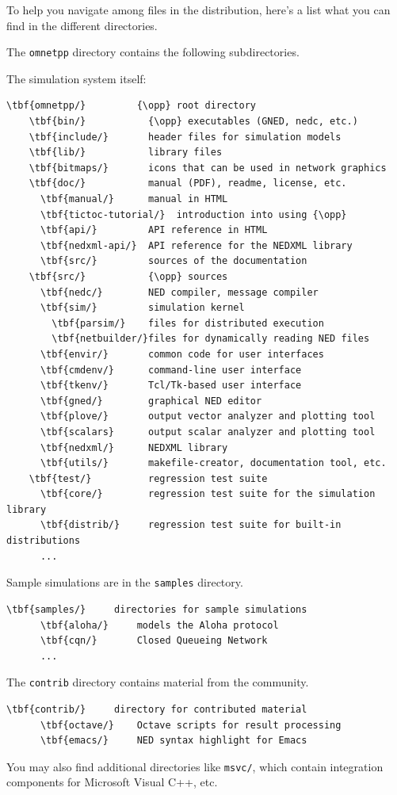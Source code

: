 To help you navigate among files in the {\opp} distribution,
here's a list what you can find in the different directories.

The \texttt{omnetpp} directory contains the following subdirectories.

The simulation system itself:

\begin{Verbatim}[commandchars=\\\{\}]
  \tbf{omnetpp/}         {\opp} root directory
    \tbf{bin/}           {\opp} executables (GNED, nedc, etc.)
    \tbf{include/}       header files for simulation models
    \tbf{lib/}           library files
    \tbf{bitmaps/}       icons that can be used in network graphics
    \tbf{doc/}           manual (PDF), readme, license, etc.
      \tbf{manual/}      manual in HTML
      \tbf{tictoc-tutorial/}  introduction into using {\opp}
      \tbf{api/}         API reference in HTML
      \tbf{nedxml-api/}  API reference for the NEDXML library
      \tbf{src/}         sources of the documentation
    \tbf{src/}           {\opp} sources
      \tbf{nedc/}        NED compiler, message compiler
      \tbf{sim/}         simulation kernel
        \tbf{parsim/}    files for distributed execution
        \tbf{netbuilder/}files for dynamically reading NED files
      \tbf{envir/}       common code for user interfaces
      \tbf{cmdenv/}      command-line user interface
      \tbf{tkenv/}       Tcl/Tk-based user interface
      \tbf{gned/}        graphical NED editor
      \tbf{plove/}       output vector analyzer and plotting tool
      \tbf{scalars}      output scalar analyzer and plotting tool
      \tbf{nedxml/}      NEDXML library
      \tbf{utils/}       makefile-creator, documentation tool, etc.
    \tbf{test/}          regression test suite
      \tbf{core/}        regression test suite for the simulation library
      \tbf{distrib/}     regression test suite for built-in distributions
      ...
\end{Verbatim}

Sample simulations are in the \texttt{samples} directory.

\begin{Verbatim}[commandchars=\\\{\}]
    \tbf{samples/}     directories for sample simulations
      \tbf{aloha/}     models the Aloha protocol
      \tbf{cqn/}       Closed Queueing Network
      ...
\end{Verbatim}

The \texttt{contrib} directory contains material from the {\opp} community.

\begin{Verbatim}[commandchars=\\\{\}]
    \tbf{contrib/}     directory for contributed material
      \tbf{octave/}    Octave scripts for result processing
      \tbf{emacs/}     NED syntax highlight for Emacs
\end{Verbatim}

You may also find additional directories like \texttt{msvc/}, which contain
integration components for Microsoft Visual C++, etc.


